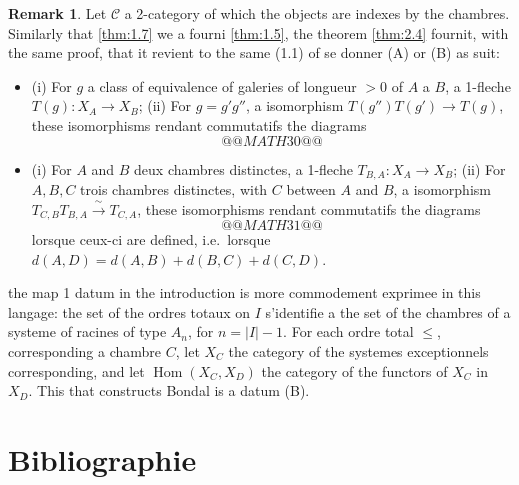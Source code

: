 \documentclass[11pt,a4paper]{article}
\theoremstyle{plain}
\theoremstyle{definition}
\newtheorem{remark}[theorem]{Remark}
\DeclareMathOperator{\Hom}{Hom}
\newcommand{\cC}{\mathscr{C}}
\begin{document}
\begin{remark}\label{rem:2.6}
Let $\cC$ a 2-category of which the objects are indexes by the chambres. Similarly that \ref{thm:1.7} we a fourni \ref{thm:1.5}, the theorem \ref{thm:2.4} fournit, with the same proof, that it revient to the same (1.1) of se donner (A) or (B) as suit:
\begin{itemize}
\item[(A)] (i) For $g$ a class of equivalence of galeries of longueur $> 0$ of $A$ a $B$, a 1-fleche $T(g) : X_A \to X_B$;
\quad (ii) For $g = g' g''$, a isomorphism $T(g'') T(g') \to T(g)$, these isomorphisms rendant commutatifs the diagrams
\[
@@MATH30@@
\]
\item[(B)] (i) For $A$ and $B$ deux chambres distinctes, a 1-fleche $T_{B,A} : X_A \to X_B$;
\quad (ii) For $A, B, C$ trois chambres distinctes, with $C$ between $A$ and $B$, a isomorphism $T_{C,B} T_{B,A} \xrightarrow{\;\sim\;} T_{C,A}$, these isomorphisms rendant commutatifs the diagrams
\[
@@MATH31@@
\]
lorsque ceux-ci are defined, i.e.\ lorsque $d(A,D) = d(A,B) + d(B,C) + d(C,D)$.
\end{itemize}
the map 1 datum in the introduction is more commodement exprimee in this langage: the set of the ordres totaux on $I$ s'identifie a the set of the chambres of a systeme of racines of type $A_n$, for $n = |I| - 1$. For each ordre total $\leq$, corresponding a chambre $C$, let $X_C$ the category of the systemes exceptionnels corresponding, and let $\Hom(X_C, X_D)$ the category of the functors of $X_C$ in $X_D$. This that constructs Bondal is a datum (B).
\end{remark}

\section*{Bibliographie}
\end{document}
